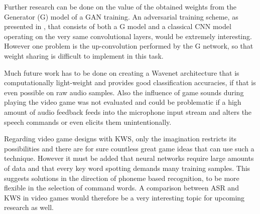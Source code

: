 Further research can be done on the value of the obtained weights from the Generator (G) model of a GAN training. 
An adversarial training scheme, as presented in \cite{Oezdenizci2020}, that consists of both a G model and a classical CNN model operating on the very same convolutional layers, would be extremely interesting. 
However one problem is the up-convolution performed by the G network, so that weight sharing is difficult to implement in this task.

Much future work has to be done on creating a Wavenet architecture that is computationally light-weight and provides good classification accuracies, if that is even possible on raw audio samples.
Also the influence of game sounds during playing the video game was not evaluated and could be problematic if a high amount of audio feedback feeds into the microphone input stream and alters the speech commands or even elicits them unintentionally.

Regarding video game designs with KWS, only the imagination restricts its possibilities and there are for sure countless great game ideas that can use such a technique.
However it must be added that neural networks require large amounts of data and that every key word spotting demands many training samples.
This suggests solutions in the direction of phoneme based recognition, to be more flexible in the selection of command words.
A comparison between ASR and KWS in video games would therefore be a very interesting topic for upcoming research as well.